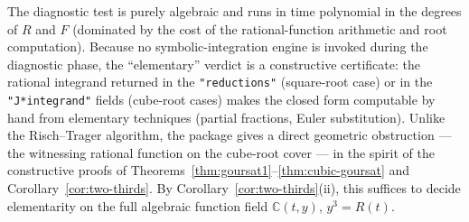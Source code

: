 \documentclass[11pt,a4paper]{article}
\theoremstyle{plain}
\theoremstyle{definition}
\theoremstyle{remark}
\newcommand{\C}{\mathbb{C}}
\begin{document}
\medskip
\noindent
The diagnostic test is purely algebraic and runs in time polynomial in the degrees of $R$ and $F$ (dominated by the cost of the rational-function arithmetic and root computation). Because no symbolic-integration engine is invoked during the diagnostic phase, the ``elementary'' verdict is a constructive certificate: the rational integrand returned in the \texttt{"reductions"} (square-root case) or in the \texttt{"J*integrand"} fields (cube-root cases) makes the closed form computable by hand from elementary techniques (partial fractions, Euler substitution). Unlike the Risch--Trager algorithm, the package gives a direct geometric obstruction --- the witnessing rational function on the cube-root cover --- in the spirit of the constructive proofs of Theorems~\ref{thm:goursat1}--\ref{thm:cubic-goursat} and Corollary~\ref{cor:two-thirds}. By Corollary~\ref{cor:two-thirds}(ii), this suffices to decide elementarity on the full algebraic function field $\C(t,y)$, $y^3=R(t)$.
\end{document}
